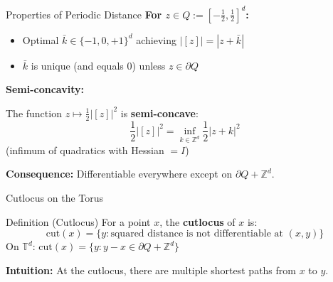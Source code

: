 \documentclass[aspectratio=169]{beamer}
\newcommand{\Z}{\mathbb{Z}}
\newcommand{\Td}{\mathbb{T}^d}
\begin{document}
\begin{frame}{Properties of Periodic Distance}
\textbf{For $z \in Q := [-\frac{1}{2}, \frac{1}{2}]^d$:}
\begin{itemize}
    \item Optimal $\bar{k} \in \{-1, 0, +1\}^d$ achieving $|[z]| = |z + \bar{k}|$
    \item $\bar{k}$ is unique (and equals $0$) unless $z \in \partial Q$
\end{itemize}

\vspace{0.4cm}
\textbf{Semi-concavity:}

The function $z \mapsto \frac{1}{2}|[z]|^2$ is \textbf{semi-concave}:
\[
\frac{1}{2}|[z]|^2 = \inf_{k \in \Z^d} \frac{1}{2}|z + k|^2
\]
(infimum of quadratics with Hessian $= I$)

\vspace{0.3cm}
\textbf{Consequence:} Differentiable everywhere except on $\partial Q + \Z^d$.
\end{frame}

\begin{frame}{Cutlocus on the Torus}
\begin{block}{Definition (Cutlocus)}
For a point $x$, the \textbf{cutlocus} of $x$ is:
\[
\text{cut}(x) = \{y : \text{squared distance is not differentiable at } (x,y)\}
\]
On $\Td$: $\text{cut}(x) = \{y : y - x \in \partial Q + \Z^d\}$
\end{block}

\vspace{0.2cm}
\begin{center}
\end{center}

\textbf{Intuition:} At the cutlocus, there are multiple shortest paths from $x$ to $y$.
\end{frame}
\end{document}
